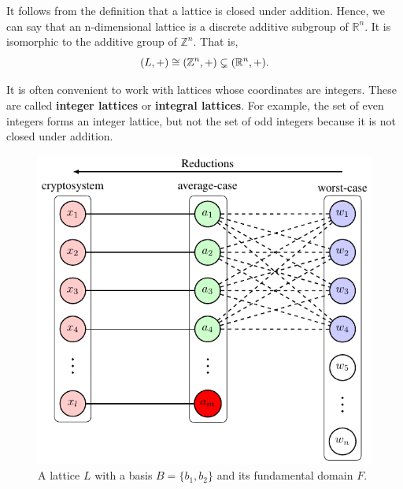 \documentclass[../main.tex]{subfiles}
\begin{document}
It follows from the definition that a lattice is closed under addition. Hence, we can say that an n-dimensional lattice is a discrete additive subgroup of $\mathbb{R}^n$. It is isomorphic to the additive group of $\mathbb{Z}^n$. That is, 
\begin{equation*}
    (L, +) \cong (\mathbb{Z}^n, +) \subsetneq (\mathbb{R}^n, +).
\end{equation*}

It is often convenient to work with lattices whose coordinates are integers. These are called \textbf{integer lattices} or \textbf{integral lattices}. 
For example, the set of even integers forms an integer lattice, but not the set of odd integers because it is not closed under addition. 

\begin{figure}[ht]
  \centering
  \includegraphics[page=2]{images/Lattice_crypto_tikz_folder.pdf}
  \caption{A lattice $L$ with a basis $B=\{b_1, b_2\}$ and its fundamental domain $F$.}
  \label{fig:lattice1}
\end{figure}
\end{document}
